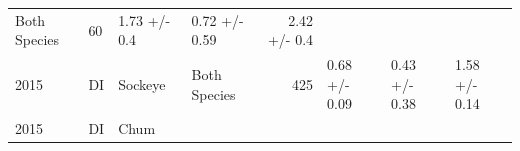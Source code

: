 \documentclass[fleqn,10pt]{wlpeerj} %
\begin{document}
\begin{longtable}[]{@{}llllrlll@{}}
\begin{minipage}[t]{0.11\columnwidth}
Both Species\strut
\end{minipage} & \begin{minipage}[t]{0.04\columnwidth}\raggedleft\strut
60\strut
\end{minipage} & \begin{minipage}[t]{0.14\columnwidth}\raggedright\strut
1.73 +/- 0.4\strut
\end{minipage} & \begin{minipage}[t]{0.14\columnwidth}\raggedright\strut
0.72 +/- 0.59\strut
\end{minipage} & \begin{minipage}[t]{0.14\columnwidth}\raggedright\strut
2.42 +/- 0.4\strut
\end{minipage}\tabularnewline
\begin{minipage}[t]{0.09\columnwidth}\raggedright\strut
2015\strut
\end{minipage} & \begin{minipage}[t]{0.06\columnwidth}\raggedright\strut
DI\strut
\end{minipage} & \begin{minipage}[t]{0.06\columnwidth}\raggedright\strut
Sockeye\strut
\end{minipage} & \begin{minipage}[t]{0.11\columnwidth}\raggedright\strut
Both Species\strut
\end{minipage} & \begin{minipage}[t]{0.04\columnwidth}\raggedleft\strut
425\strut
\end{minipage} & \begin{minipage}[t]{0.14\columnwidth}\raggedright\strut
0.68 +/- 0.09\strut
\end{minipage} & \begin{minipage}[t]{0.14\columnwidth}\raggedright\strut
0.43 +/- 0.38\strut
\end{minipage} & \begin{minipage}[t]{0.14\columnwidth}\raggedright\strut
1.58 +/- 0.14\strut
\end{minipage}\tabularnewline
\begin{minipage}[t]{0.09\columnwidth}\raggedright\strut
2015\strut
\end{minipage} & \begin{minipage}[t]{0.06\columnwidth}\raggedright\strut
DI\strut
\end{minipage} & \begin{minipage}[t]{0.06\columnwidth}\raggedright\strut
Chum\strut
\end{minipage} & \begin{minipage}[t]{0.11\columnwidth}\raggedright\strut

\end{minipage}
\end{longtable}
\end{document}
